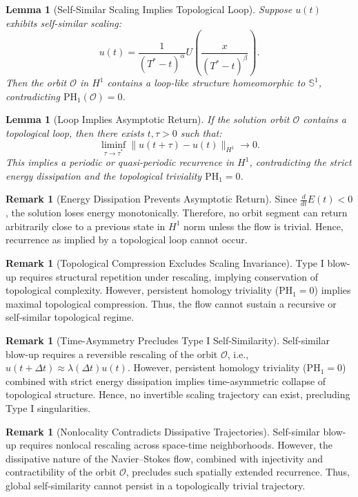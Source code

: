 \documentclass[11pt]{article}
\newtheorem{lemma}[theorem]{Lemma}
\theoremstyle{definition}
\newtheorem{remark}[theorem]{Remark}
\begin{document}
\begin{lemma}[Self-Similar Scaling Implies Topological Loop]
Suppose $u(t)$ exhibits self-similar scaling:
\[
u(t) = \frac{1}{(T^* - t)^\alpha} U\left( \frac{x}{(T^* - t)^\beta} \right).
\]
Then the orbit $\mathcal{O}$ in $H^1$ contains a loop-like structure homeomorphic to $\mathbb{S}^1$, contradicting $\mathrm{PH}_1(\mathcal{O}) = 0$.
\end{lemma}

\begin{lemma}[Loop Implies Asymptotic Return]
If the solution orbit $\mathcal{O}$ contains a topological loop, then there exists $t, \tau > 0$ such that:
\[
\liminf_{\tau \to \tau^*} \|u(t + \tau) - u(t)\|_{H^1} \to 0.
\]
This implies a periodic or quasi-periodic recurrence in $H^1$, contradicting the strict energy dissipation and the topological triviality $\mathrm{PH}_1 = 0$.
\end{lemma}

\begin{remark}[Energy Dissipation Prevents Asymptotic Return]
Since $\frac{d}{dt} E(t) < 0$, the solution loses energy monotonically. Therefore, no orbit segment can return arbitrarily close to a previous state in $H^1$ norm unless the flow is trivial. Hence, recurrence as implied by a topological loop cannot occur.
\end{remark}

\begin{remark}[Topological Compression Excludes Scaling Invariance]
Type I blow-up requires structural repetition under rescaling, implying conservation of topological complexity. However, persistent homology triviality ($\mathrm{PH}_1 = 0$) implies maximal topological compression. Thus, the flow cannot sustain a recursive or self-similar topological regime.
\end{remark}

\begin{remark}[Time-Asymmetry Precludes Type I Self-Similarity]
Self-similar blow-up requires a reversible rescaling of the orbit $\mathcal{O}$, i.e., $u(t+\Delta t) \approx \lambda(\Delta t) u(t)$. However, persistent homology triviality ($\mathrm{PH}_1 = 0$) combined with strict energy dissipation implies time-asymmetric collapse of topological structure. Hence, no invertible scaling trajectory can exist, precluding Type I singularities.
\end{remark}

\begin{remark}[Nonlocality Contradicts Dissipative Trajectories]
Self-similar blow-up requires nonlocal rescaling across space-time neighborhoods. However, the dissipative nature of the Navier--Stokes flow, combined with injectivity and contractibility of the orbit $\mathcal{O}$, precludes such spatially extended recurrence. Thus, global self-similarity cannot persist in a topologically trivial trajectory.
\end{remark}
\end{document}
